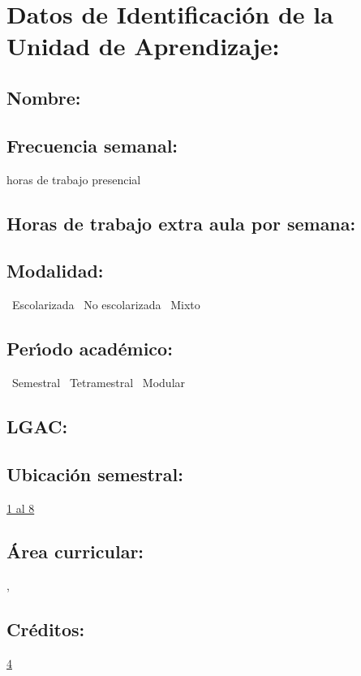 \documentclass[10 pt]{article}
\begin{document}

\section{Datos de Identificaci\'{o}n de la Unidad de Aprendizaje:}
\subsection{Nombre:} 
\subsection{Frecuencia semanal:} horas de trabajo presencial
\subsection{Horas de trabajo extra aula por semana:}  %
\subsection{Modalidad:} \yes~Escolarizada \no~No escolarizada \no~Mixto
\subsection{Per\'{\i}odo acad\'{e}mico:} \yes~Semestral
\no~Tetramestral \no~Modular

%
%

\subsection{LGAC:} \underline{\seys}

\subsection{Ubicaci\'{o}n semestral:} \underline{1 al 8} %
\subsection{\'{A}rea curricular:} \underline{\fb, \le} %
\subsection{Cr\'{e}ditos:} \underline{4} %
\end{document}
